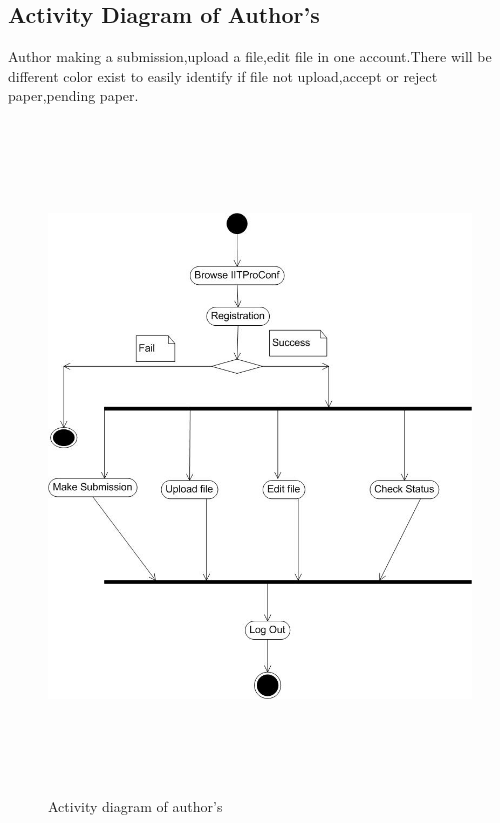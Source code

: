 \subsection{Activity Diagram of Author’s}
Author making a submission,upload a file,edit file in one account.There will be different color exist to easily identify if file not upload,accept or reject paper,pending paper.
\begin{figure}[h!]
\centering
  \includegraphics[width=6in,height=7in]{pic/aca}
  \caption{Activity diagram of  author’s}\label{activitya}
\end{figure}

